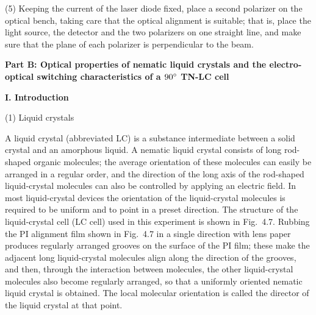 (5) Keeping the current of the laser diode fixed, place a second polarizer on the optical bench, taking care that the optical alignment is suitable; that is, place the light source, the detector and the two polarizers on one straight line, and make sure that the plane of each polarizer is perpendicular to the beam.

\textbf{Part B: Optical properties of nematic liquid crystals and the electro-optical switching characteristics of a $90^{\circ}$ TN-LC cell}

\noindent\textbf{I. Introduction}

(1) Liquid crystals

A liquid crystal (abbreviated LC) is a substance intermediate between a solid crystal and an amorphous liquid. A nematic liquid crystal consists of long rod-shaped organic molecules; the average orientation of these molecules can easily be arranged in a regular order, and the direction of the long axis of the rod-shaped liquid-crystal molecules can also be controlled by applying an electric field. In most liquid-crystal devices the orientation of the liquid-crystal molecules is required to be uniform and to point in a preset direction. The structure of the liquid-crystal cell (LC cell) used in this experiment is shown in Fig.~4.7. Rubbing the PI alignment film shown in Fig.~4.7 in a single direction with lens paper produces regularly arranged grooves on the surface of the PI film; these make the adjacent long liquid-crystal molecules align along the direction of the grooves, and then, through the interaction between molecules, the other liquid-crystal molecules also become regularly arranged, so that a uniformly oriented nematic liquid crystal is obtained. The local molecular orientation is called the director of the liquid crystal at that point.

